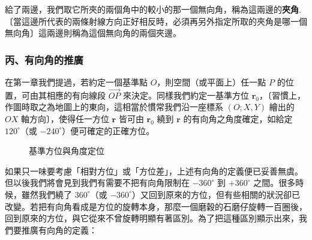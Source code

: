 給了兩邊，我們取它所夾的兩個角中的較小的那一個無向角，稱為這兩邊的\textbf{夾角}.〔當這邊所代表的兩條射線方向正好相反時，必須再另外指定所取的夾角是哪一個無向角〕這兩邊則稱為這個無向角的兩個夾邊。

\subsubsection*{丙、有向角的推廣}

在第一章我們提過，若約定一個基準點 $O$，則空間（或平面上）任一點 $P$ 的位置，可由其相應的有向線段 $\vec{OP}$ 來決定。同樣我們約定一基準方位 $\mathbf{r}_0$，〔習慣上，作圖時取之為地圖上的東向，這相當於慣常我們沿一座標系 $(O; X, Y)$ 繪出的 $OX$ 軸方向〕，使得任一方位 $\mathbf{r}$ 皆可由 $\mathbf{r}_0$ 繞到 $\mathbf{r}$ 的有向角之角度確定，如給定 $120^\circ$（或 $-240^\circ$）便可確定的正確方位。

\begin{figure}[H]
\centering
{}
\caption{基準方位與角度定位}
\label{fig:b3s-fig2-6}
\end{figure}

如果只一味要考慮「相對方位」或「方位差」，上述有向角的定義便已妥善無虞。但以後我們將會見到我們有需要不把有向角限制在 $-360^\circ$ 到 $+360^\circ$ 之間。很多時候，雖然我們繞了 $360^\circ$（或 $-360^\circ$）又回到原來的方位，但有些相關的狀況卻已改變。若把有向角看成是方位的旋轉本身，那麼一個磨穀的石磨仔旋轉一百圈後，回到原來的方位，與它從來不曾旋轉明顯有著區別。為了把這種區別顯示出來，我們要推廣有向角的定義：

